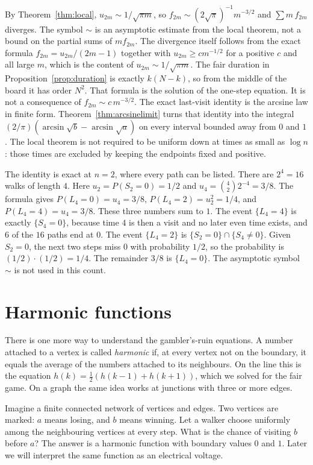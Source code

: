 By Theorem~\ref{thm:local}, $u_{2m}\sim 1/\sqrt{\pi m}$, so $f_{2m}\sim (2\sqrt\pi)^{-1}m^{-3/2}$ and $\sum m\,f_{2m}$ diverges. The symbol $\sim$ is an asymptotic estimate from the local theorem, not a bound on the partial sums of $m f_{2m}$. The divergence itself follows from the exact formula $f_{2m}=u_{2m}/(2m-1)$ together with $u_{2m}\ge c m^{-1/2}$ for a positive $c$ and all large $m$, which is the content of $u_{2m}\sim 1/\sqrt{\pi m}$. The fair duration in Proposition~\ref{prop:duration} is exactly $k(N-k)$, so from the middle of the board it has order $N^2$. That formula is the solution of the one-step equation. It is not a consequence of $f_{2m}\sim c\,m^{-3/2}$. The exact last-visit identity is the arcsine law in finite form. Theorem~\ref{thm:arcsinelimit} turns that identity into the integral $(2/\pi)(\arcsin\sqrt b-\arcsin\sqrt a)$ on every interval bounded away from $0$ and $1$. The local theorem is not required to be uniform down at times as small as $\log n$: those times are excluded by keeping the endpoints fixed and positive.

The identity is exact at $n=2$, where every path can be listed. There are $2^4=16$ walks of length $4$. Here $u_2=P(S_2=0)=1/2$ and $u_4=\binom{4}{2}2^{-4}=3/8$. The formula gives $P(L_4=0)=u_4=3/8$, $P(L_4=2)=u_2^2=1/4$, and $P(L_4=4)=u_4=3/8$. These three numbers sum to $1$. The event $\{L_4=4\}$ is exactly $\{S_4=0\}$, because time $4$ is then a visit and no later even time exists, and $6$ of the $16$ paths end at $0$. The event $\{L_4=2\}$ is $\{S_2=0\}\cap\{S_4\ne0\}$. Given $S_2=0$, the next two steps miss $0$ with probability $1/2$, so the probability is $(1/2)\cdot(1/2)=1/4$. The remainder $3/8$ is $\{L_4=0\}$. The asymptotic symbol $\sim$ is not used in this count.

\section{Harmonic functions}

There is one more way to understand the gambler's-ruin equations. A number attached to a vertex is called \emph{harmonic} if, at every vertex not on the boundary, it equals the average of the numbers attached to its neighbours. On the line this is the equation $h(k)=\frac12(h(k-1)+h(k+1))$, which we solved for the fair game. On a graph the same idea works at junctions with three or more edges.

Imagine a finite connected network of vertices and edges. Two vertices are marked: $a$ means losing, and $b$ means winning. Let a walker choose uniformly among the neighbouring vertices at every step. What is the chance of visiting $b$ before $a$? The answer is a harmonic function with boundary values $0$ and $1$. Later we will interpret the same function as an electrical voltage.

